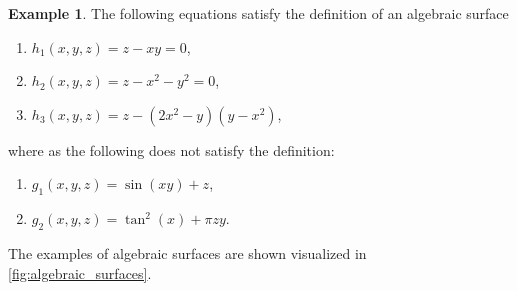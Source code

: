 \documentclass{article}
\theoremstyle{definition}
\newtheorem{example}{Example}
\begin{document}
\begin{example}
    \label{exmpl:algebraic_surfaces}
    The following equations satisfy the definition of an algebraic surface
    \begin{enumerate}
        \item $h_1(x, y, z) = z - xy = 0$,
        \item $h_2(x, y, z) = z - x^2 - y^2 = 0$,
        \item $h_3(x, y, z) = z - (2x^2-y)(y-x^2)$,
    \end{enumerate}
    where as the following does not satisfy the definition:
    \begin{enumerate}
        \item $g_1(x, y, z) = \sin(xy) + z$,
        \item $g_2(x, y, z) = \tan^2(x) + \pi zy$.
    \end{enumerate}
    The examples of algebraic surfaces are shown visualized in
    \cref{fig:algebraic_surfaces}.


\end{example}
\end{document}
